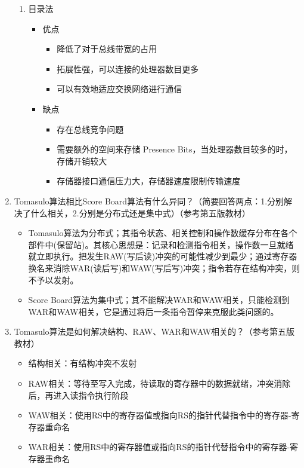 \documentclass[UTF8]{article}
\begin{document}
\begin{enumerate}
\begin{enumerate}
            \item 目录法
            \begin{itemize}
                \item 优点
                \begin{itemize}
                    \item 降低了对于总线带宽的占用
                    \item 拓展性强，可以连接的处理器数目更多
                    \item 可以有效地适应交换网络进行通信
                \end{itemize}
                \item 缺点
                \begin{itemize}
                    \item 存在总线竞争问题
                    \item 需要额外的空间来存储 Presence Bits，当处理器数目较多的时，存储开销较大
                    \item 存储器接口通信压力大，存储器速度限制传输速度
                \end{itemize}
            \end{itemize}
        \end{enumerate}
        \item Tomasulo算法相比Score Board算法有什么异同？（简要回答两点：1.分别解决了什么相关，2.分别是分布式还是集中式）（参考第五版教材）
        \begin{itemize}
            \item Tomasulo算法为分布式；其指令状态、相关控制和操作数缓存分布在各个部件中(保留站)。其核心思想是：记录和检测指令相关，操作数一旦就绪就立即执行。把发生RAW(写后读)冲突的可能性减少到最少；通过寄存器换名来消除WAR(读后写)和WAW(写后写)冲突；指令若存在结构冲突，则不予以发射。
            \item Score Board算法为集中式；其不能解决WAR和WAW相关，只能检测到WAR和WAW相关，它是通过将后一条指令暂停来克服此类问题的。
        \end{itemize}
        \item Tomasulo算法是如何解决结构、RAW、WAR和WAW相关的？（参考第五版教材）
        \begin{itemize}
            \item 结构相关：有结构冲突不发射
            \item RAW相关：等待至写入完成，待读取的寄存器中的数据就绪，冲突消除后，再进入读指令执行阶段
            \item WAW相关：使用RS中的寄存器值或指向RS的指针代替指令中的寄存器-寄存器重命名
            \item WAR相关：使用RS中的寄存器值或指向RS的指针代替指令中的寄存器-寄存器重命名
        \end{itemize}
    \end{enumerate}
\end{document}
